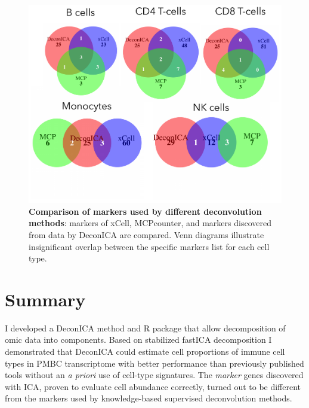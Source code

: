 \documentclass[12pt,]{book}
\theoremstyle{definition}
\theoremstyle{definition}
\theoremstyle{definition}
\theoremstyle{remark}
\begin{document}
\begin{figure}

{\centering \includegraphics[width=1\linewidth]{figures-ext/venn} 

}

\caption[Comparison of markers used by different deconvolution methods]{\textbf{Comparison of markers used by different
deconvolution methods}: markers of xCell, MCPcounter, and markers
discovered from data by DeconICA are compared. Venn diagrams illustrate
insignificant overlap between the specific markers list for each cell
type.}\label{fig:venn}
\end{figure}







\hypertarget{summary-4}{%
\section{Summary}\label{summary-4}}

I developed a DeconICA method and R package that allow decomposition of
omic data into components. Based on stabilized fastICA decomposition I
demonstrated that DeconICA could estimate cell proportions of immune
cell types in PMBC transcriptome with better performance than previously
published tools without an \emph{a priori} use of cell-type signatures.
The \emph{marker} genes discovered with ICA, proven to evaluate cell
abundance correctly, turned out to be different from the markers used by
knowledge-based supervised deconvolution methods.
\end{document}
